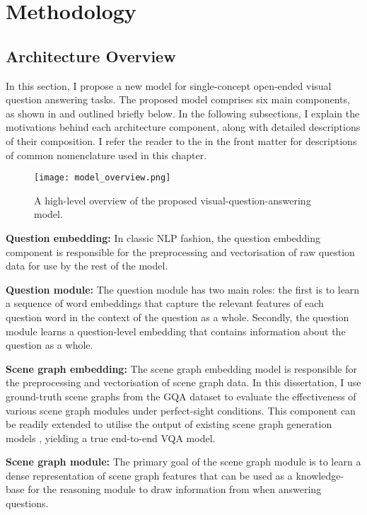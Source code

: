 \chapter{Methodology}
\label{chapter:methodology}

\section{Architecture Overview}
\label{section:architecture_overview}

In this section, I propose a new model for single-concept open-ended visual question answering tasks. The proposed model comprises six main components, as shown in \figureautorefname{ \ref{fig:model_overview}} and outlined briefly below. In the following subsections, I explain the motivations behind each architecture component, along with detailed descriptions of their composition. I refer the reader to the  in the front matter for descriptions of common nomenclature used in this chapter.


\begin{figure}[htbp]
    \centering
    \texttt{[image: model\_overview.png]}
    \caption{A high-level overview of the proposed visual-question-answering model.}
    \label{fig:model_overview}
\end{figure}

\textbf{Question embedding:} In classic NLP fashion, the question embedding component is responsible for the preprocessing and vectorisation of raw question data for use by the rest of the model.

\textbf{Question module:} The question module has two main roles: the first is to learn a sequence of word embeddings that capture the relevant features of each question word in the context of the question as a whole. Secondly, the question module learns a question-level embedding that contains information about the question as a whole.

\textbf{Scene graph embedding:} The scene graph embedding model is responsible for the preprocessing and vectorisation of scene graph data. In this dissertation, I use ground-truth scene graphs from the GQA dataset to evaluate the effectiveness of various scene graph modules under perfect-sight conditions. This component can be readily extended to utilise the output of existing scene graph generation models \cite{yang2018graph, li2019relation}, yielding a true end-to-end VQA model.

\textbf{Scene graph module:} The primary goal of the scene graph module is to learn a dense representation of scene graph features that can be used as a knowledge-base for the reasoning module to draw information from when answering questions.

